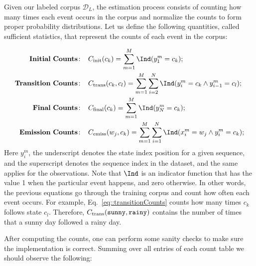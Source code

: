Given our labeled corpus $\mathcal{D}_L$, the estimation process consists of counting how
many times each event occurs in the corpus and normalize the counts to
form proper probability distributions. Let us define the following
quantities, called sufficient statistics, that represent the counts of
each event in the corpus:

\begin{align}
\mathbf{Initial \ Counts\!:}\;\;\;\;  &  C_{\mathrm{init}}(c_k) = \sum_{m=1}^M
\Ind (y^m_1 = c_k); \label{eq::initialCounts}\\
%
%
\mathbf{Transition \ Counts\!:}\;\;\;\;  &  C_{\mathrm{trans}}(c_k,c_l) =
\sum_{m=1}^M  \sum_{i = 2}^{N}
\Ind (y^m_i = c_k \wedge y^m_{i-1} = c_l); \label{eq::transitionCounts}\\
%
\mathbf{Final \ Counts\!:}\;\;\;\;  &  C_{\mathrm{final}}(c_k) = \sum_{m=1}^M
\Ind (y^m_N = c_k); \label{eq::finalCounts}\\
%
\mathbf{Emission \ Counts\!:}\;\;\;\;  &  
C_{\mathrm{emiss}}(w_j,c_k) = \sum_{m=1}^M
\sum_{i = 1}^{N}
\Ind (x^m_i = w_j \wedge y^m_i = c_k); \label{eq::emissionCounts}
\end{align}
Here $y^m_i$,  the underscript denotes the state index position for a given sequence, and the superscript denotes the sequence index in the dataset, and the same applies for the observations.
Note that $\Ind$ is an indicator function that has the value 1 when the
particular event happens, and zero otherwise. In other words, the previous
equations go through the training corpus and count how
often each event occurs. For example, Eq.~\ref{eq::transitionCounts} counts how many times $c_k$ follows state $c_l$. Therefore, $C_{\mathrm{trans}}(\text{\tt sunny},\text{\tt rainy})$ contains the number of times that a sunny day followed a rainy day.

%


After computing the counts, one can perform some sanity checks
to make sure the implementation is correct. Summing over all entries
of each count table we should observe the following:

